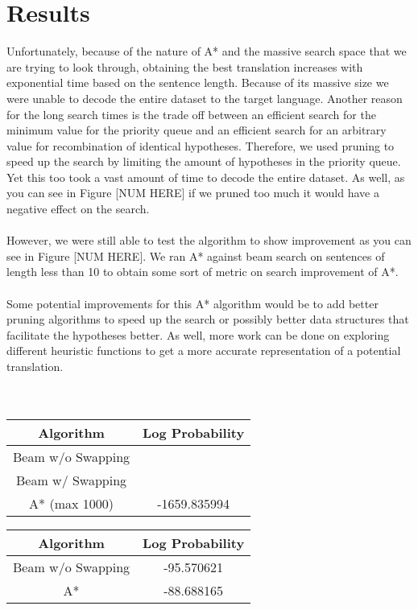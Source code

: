 \documentclass[11pt]{article}
\begin{document}
\section{Results}
Unfortunately, because of the nature of A* and the massive search space that we are trying to look through, obtaining the best translation increases with exponential time based on the sentence length. Because of its massive size we were unable to decode the entire dataset to the target language. Another reason for the long search times is the trade off between an efficient search for the minimum value for the priority queue and an efficient search for an arbitrary value for recombination of identical hypotheses. Therefore, we used pruning to speed up the search by limiting the amount of hypotheses in the priority queue. Yet this too took a vast amount of time to decode the entire dataset. As well, as you can see in Figure [NUM HERE] if we pruned too much it would have a negative effect on the search. \\\\
However, we were still able to test the algorithm to show improvement as you can see in Figure [NUM HERE]. We ran A* against beam search on sentences of length less than 10 to obtain some sort of metric on search improvement of A*. \\\\
Some potential improvements for this A* algorithm would be to add better pruning algorithms to speed up the search or possibly better data structures that facilitate the hypotheses better. As well, more work can be done on exploring different heuristic functions to get a more accurate representation of a potential translation.
\\\\\\
\begin{minipage}{0.5\linewidth} 
\begin{tabular}{|c|c|}
\hline
Algorithm & Log Probability \\ \hline
Beam w/o Swapping & \\ \hline
Beam w/ Swapping & \\ \hline
A* (max 1000) & -1659.835994 \\ \hline
\end{tabular} 
\end{minipage} 
\hspace{0.5cm} 
\begin{minipage}{0.5\linewidth} 
\begin{tabular}{|c|c|}
\hline
Algorithm & Log Probability \\ \hline
Beam w/o Swapping & -95.570621\\ \hline
A* & -88.688165 \\ \hline
\end{tabular} 
\end{minipage}
\end{document}
